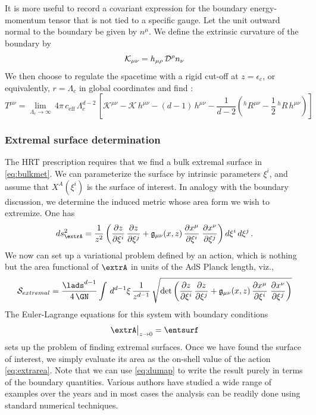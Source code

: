 \documentclass[12pt,openany]{book}
\begin{document}
It is  more useful to record a covariant expression for the boundary energy-momentum tensor that is not tied to a specific gauge. Let the unit outward normal to the boundary be given by $n^\mu$. We define the extrinsic curvature of the boundary by
%
\begin{equation}
\mathcal{K}_{\mu\nu} = h_{\mu\rho} \, {\cal D}^\rho n_\nu
\label{eq:extrinsic}
\end{equation}
%
We then choose to regulate the spacetime with a rigid cut-off at $z = \epsilon_c$,  or equivalently, $r = \Lambda_c$ in global coordinates and find \cite{Balasubramanian:1999re}:
%
\begin{equation}
T^{\mu\nu} = \lim_{\Lambda_c \to \infty} \, 4\pi\, c_\text{eff}\, \Lambda_c^{d-2}\, \left[ \mathcal{K}^{\mu\nu} -\mathcal{K} \, h^{\mu\nu}
- (d-1)\, h^{\mu\nu} - \frac{1}{d-2} \left( {}^h R^{\mu\nu} - \frac{1}{2}\, {}^h R\, h^{\mu\nu} \right)\right]
\label{}
\end{equation}
%

\subsubsection{Extremal surface determination}

The HRT prescription requires that we find a bulk extremal surface in \eqref{eq:bulkmet}. We can parameterize the surface by intrinsic parameters $\xi^i$, and assume that $X^A(\xi^i)$ is the surface of interest. In analogy with the boundary discussion, we determine the induced metric whose area form we wish to extremize. One has
%
\begin{equation}
ds^2_{\extrA} = \frac{1}{z^2} \left(\frac{\partial z}{\partial \xi^i}\, \frac{\partial z}{\partial \xi^j} +
\mathfrak{g}_{\mu\nu}(x,z) \, \frac{\partial x^\mu}{\partial \xi^i} \; \frac{\partial x^\nu}{\partial \xi^j} \right) d\xi^i\, d\xi^j \,.
\label{eq:inducedE}
\end{equation}
%
We now can set up a variational problem defined by an action, which is nothing but the area functional of $\extrA$ in units of the AdS Planck length, viz.,
%
\begin{equation}
{\cal S}_{extremal}=\frac{\lads^{d-1}}{4\, \GN } \int \, d^{d-1}\xi\, \frac{1}{z^{d-1}} \, \sqrt{ \text{det}\left(\frac{\partial z}{\partial \xi^i}\, \frac{\partial z}{\partial \xi^j} +
\mathfrak{g}_{\mu\nu}(x,z) \, \frac{\partial x^\mu}{\partial \xi^i} \; \frac{\partial x^\nu}{\partial \xi^j} \right)}
\label{eq:extrarea}
\end{equation}
%
The Euler-Lagrange equations for this system with boundary conditions
%
\begin{equation}
\extrA \big|_{z \to 0} = \entsurf
\label{}
\end{equation}
%
sets up the problem of finding extremal surfaces. Once we  have found the surface of interest, we simply evaluate its area as the on-shell value of the action \eqref{eq:extrarea}. Note that we can use \eqref{eq:dumap} to write the result purely in terms of the boundary quantities. Various authors have studied a wide range of examples over the years and in most cases the analysis can be readily done using standard numerical techniques.
\end{document}
